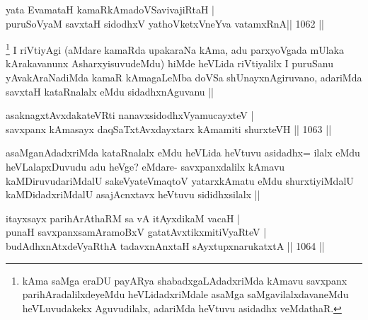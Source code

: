 
\begin{shl}
yata EvamataH kamaRkAmadoVSavivajiRtaH | \\
puruSoV\s yaM savxtaH sidodhxV yathoVketxVneYva vatamxRnA\hfill ||  1062 ||  
\end{shl}

\begin{artha}
\footnote{kAma saMga eraDU payARya shabadxgaLAdadxriMda kAmavu savxpanx parihAradalilxdeyeMdu heVLidadxriMdale asaMga saMgavilalxdavaneMdu heVLuvudakekx Aguvudilalx, adariMda heVtuvu asidadhx veMdathaR.}
I riVtiyAgi (aMdare kamaRda upakaraNa kAma, adu parxyoVgada mUlaka kArakavanunx AsharxyisuvudeMdu) hiMde heVLida riVtiyalilx I puruSanu yAvakAraNadiMda kamaR kAmagaLeMba doVSa shUnayxnAgiruvano, adariMda savxtaH kataRnalalx eMdu sidadhxnAguvanu ||
\end{artha}


\begin{shl}
asaknagxtAvxdakateVRti nanavxsidodhxV\s yamucayxteV | \\
savxpanx kAmasayx daqSaTxtAvxdayxtarx kAmamiti shurxteVH \hfill||  1063 ||  
\end{shl}

\begin{artha}
asaMganAdadxriMda kataRnalalx eMdu heVLida heVtuvu asidadhx= ilalx eMdu heVLalapxDuvudu adu heVge? eMdare- savxpanxdalilx kAmavu kaMDiruvudariMdalU sakeVyateV\s maqtoV yatarxkAmatu eMdu shurxtiyiMdalU kaMDidadxriMdalU asajAcnxtavx heVtuvu sididhxsilalx ||
\end{artha}


\begin{shl}
itayxsayx parihArAthaRM sa vA itAyxdikaM vacaH | \\
punaH savxpanxsamAramoBxV gatatAvxtikxmitiVyaRteV | \\
budAdhxnAtxdeVyaRthA tadavxnAnxtaH sAyxtupxnarukatxtA \hfill||  1064 ||  
\end{shl}

